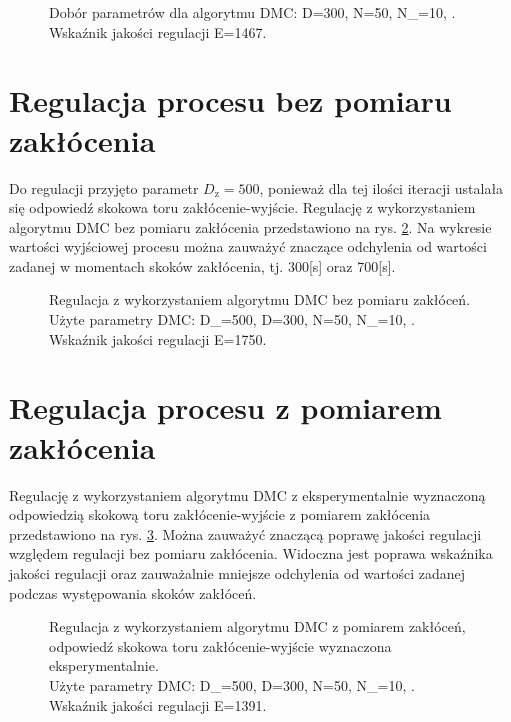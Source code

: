 \documentclass[a4paper,titlepage,11pt,twosides,floatssmall]{mwrep}
\begin{document}
\begin{figure}[H]
	\centering
	
	\caption{Dobór parametrów dla algorytmu DMC: D=300, N=50, N_{}=10, .\\ Wskaźnik jakości regulacji E=1467.}
	\label{dobor_param_DMC2}
\end{figure}

\section{Regulacja procesu bez pomiaru zakłócenia}
Do regulacji przyjęto parametr $D_{\mathrm{z}}=500$, ponieważ dla tej ilości iteracji ustalała się odpowiedź skokowa toru zakłócenie-wyjście. Regulację z wykorzystaniem algorytmu DMC bez pomiaru zakłócenia przedstawiono na rys. \ref{bez_kom_1}. Na wykresie wartości wyjściowej procesu można zauważyć znaczące odchylenia od wartości zadanej w momentach skoków zakłócenia, tj. 300[s] oraz 700[s].

\begin{figure}[htb]
	\centering
	
	\caption{Regulacja z wykorzystaniem algorytmu DMC bez pomiaru zakłóceń. \\Użyte parametry DMC: D_{}=500, D=300, N=50, N_{}=10, .\\ Wskaźnik jakości regulacji E=1750.}
	\label{bez_kom_1}
\end{figure}

\section{Regulacja procesu z pomiarem zakłócenia}

Regulację z wykorzystaniem algorytmu DMC z eksperymentalnie wyznaczoną odpowiedzią skokową toru zakłócenie-wyjście z pomiarem zakłócenia przedstawiono na rys. \ref{kom_s_eksp}. Można zauważyć znaczącą poprawę jakości regulacji względem regulacji bez pomiaru zakłócenia. Widoczna jest poprawa wskaźnika jakości regulacji oraz zauważalnie mniejsze odchylenia od wartości zadanej podczas występowania skoków zakłóceń.

\begin{figure}[htb]
	\centering
	
	\caption{Regulacja z wykorzystaniem algorytmu DMC z pomiarem zakłóceń, odpowiedź skokowa toru zakłócenie-wyjście wyznaczona eksperymentalnie. \\Użyte parametry DMC: D_{}=500, D=300, N=50, N_{}=10, .\\ Wskaźnik jakości regulacji E=1391.}
	\label{kom_s_eksp}
\end{figure}
\end{document}
